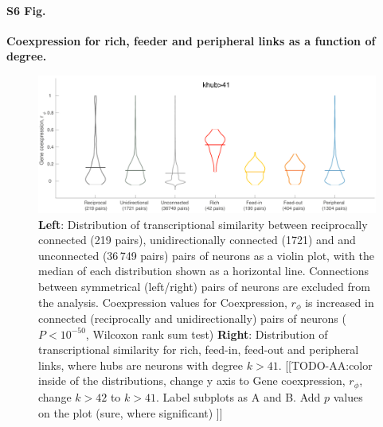 \documentclass[10pt,letterpaper]{article}
\begin{document}
\paragraph*{S6 Fig.}
{\bf Coexpression for rich, feeder and peripheral links as a function of degree.}
\begin{figure}[!h]
\label{RFPdistributions}
\centering
    \includegraphics[width=1\textwidth]{Distributions.pdf}
    \caption{
\textbf{Left}: Distribution of transcriptional similarity between reciprocally connected (219 pairs), unidirectionally connected (1721) and  and unconnected (36\,749 pairs) pairs of neurons as a violin plot, with the median of each distribution shown as a horizontal line.
Connections between symmetrical (left/right) pairs of neurons are excluded from the analysis. Coexpression values for 
Coexpression, $r_\phi$ is increased in connected (reciprocally and unidirectionally) pairs of neurons ($P < 10^{-50}$, Wilcoxon rank sum test)
\textbf{Right}: Distribution of transcriptional similarity for rich, feed-in, feed-out and peripheral links, where hubs are neurons with degree $k>41$.
[[TODO-AA:color inside of the distributions, change y axis to Gene coexpression, $r_\phi$, change $k>42$ to $k>41$.
Label subplots as A and B.
Add $p$ values on the plot (sure, where significant)
]]
}
\end{figure}

\end{document}
